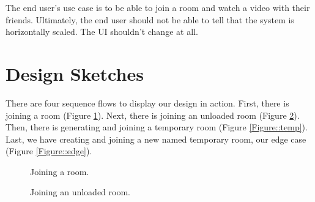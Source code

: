 The end user's use case is to be able to join a room and watch a video with their friends. Ultimately, the end user should not be
able to tell that the system is horizontally scaled. The UI shouldn't change at all.

\section{Design Sketches}

There are four sequence flows to display our design in action. First, there is joining a room (Figure \ref{Figure::room}). Next, there is joining an unloaded room (Figure \ref{Figure::unloaded}). Then, there is generating and joining a temporary room (Figure \ref{Figure::temp}). Last, we have creating and joining a new named temporary room, our edge case (Figure \ref{Figure::edge}).

\begin{figure}
  \centering
  \caption{\label{Figure::room} Joining a room.}
\end{figure}

\begin{figure}
  \centering
  \caption{\label{Figure::unloaded} Joining an unloaded room.}
\end{figure}

